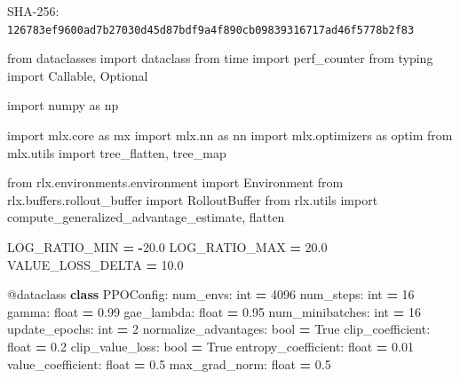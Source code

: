 \documentclass[
  american,
  11pt,
  letterpaper,
]{article}
\newenvironment{Shaded}{\begin{snugshade}}{\end{snugshade}}
\newcommand{\AttributeTok}[1]{\textcolor[rgb]{0.13,0.29,0.53}{#1}}
\newcommand{\BuiltInTok}[1]{#1}
\newcommand{\DecValTok}[1]{\textcolor[rgb]{0.00,0.00,0.81}{#1}}
\newcommand{\FloatTok}[1]{\textcolor[rgb]{0.00,0.00,0.81}{#1}}
\newcommand{\ImportTok}[1]{#1}
\newcommand{\KeywordTok}[1]{\textcolor[rgb]{0.13,0.29,0.53}{\textbf{#1}}}
\newcommand{\NormalTok}[1]{#1}
\newcommand{\OperatorTok}[1]{\textcolor[rgb]{0.81,0.36,0.00}{\textbf{#1}}}
\newcommand{\VariableTok}[1]{\textcolor[rgb]{0.00,0.00,0.00}{#1}}
\renewenvironment{Shaded}{\par\smallskip}{\par\smallskip}
\begin{document}
SHA-256:
\texttt{126783ef\allowbreak{}9600ad7b\allowbreak{}27030d45\allowbreak{}d87bdf9a\allowbreak{}4f890cb0\allowbreak{}98393167\allowbreak{}17ad46f5\allowbreak{}778b2f83\allowbreak{}}

\begin{Shaded}
\begin{Highlighting}[]
\ImportTok{from}\NormalTok{ dataclasses }\ImportTok{import}\NormalTok{ dataclass}
\ImportTok{from}\NormalTok{ time }\ImportTok{import}\NormalTok{ perf\_counter}
\ImportTok{from}\NormalTok{ typing }\ImportTok{import}\NormalTok{ Callable, Optional}

\ImportTok{import}\NormalTok{ numpy }\ImportTok{as}\NormalTok{ np}

\ImportTok{import}\NormalTok{ mlx.core }\ImportTok{as}\NormalTok{ mx}
\ImportTok{import}\NormalTok{ mlx.nn }\ImportTok{as}\NormalTok{ nn}
\ImportTok{import}\NormalTok{ mlx.optimizers }\ImportTok{as}\NormalTok{ optim}
\ImportTok{from}\NormalTok{ mlx.utils }\ImportTok{import}\NormalTok{ tree\_flatten, tree\_map}

\ImportTok{from}\NormalTok{ rlx.environments.environment }\ImportTok{import}\NormalTok{ Environment}
\ImportTok{from}\NormalTok{ rlx.buffers.rollout\_buffer }\ImportTok{import}\NormalTok{ RolloutBuffer}
\ImportTok{from}\NormalTok{ rlx.utils }\ImportTok{import}\NormalTok{ compute\_generalized\_advantage\_estimate, flatten}


\NormalTok{LOG\_RATIO\_MIN }\OperatorTok{=} \OperatorTok{{-}}\FloatTok{20.0}
\NormalTok{LOG\_RATIO\_MAX }\OperatorTok{=} \FloatTok{20.0}
\NormalTok{VALUE\_LOSS\_DELTA }\OperatorTok{=} \FloatTok{10.0}


\AttributeTok{@dataclass}
\KeywordTok{class}\NormalTok{ PPOConfig:}
\NormalTok{    num\_envs: }\BuiltInTok{int} \OperatorTok{=} \DecValTok{4096}
\NormalTok{    num\_steps: }\BuiltInTok{int} \OperatorTok{=} \DecValTok{16}
\NormalTok{    gamma: }\BuiltInTok{float} \OperatorTok{=} \FloatTok{0.99}
\NormalTok{    gae\_lambda: }\BuiltInTok{float} \OperatorTok{=} \FloatTok{0.95}
\NormalTok{    num\_minibatches: }\BuiltInTok{int} \OperatorTok{=} \DecValTok{16}
\NormalTok{    update\_epochs: }\BuiltInTok{int} \OperatorTok{=} \DecValTok{2}
\NormalTok{    normalize\_advantages: }\BuiltInTok{bool} \OperatorTok{=} \VariableTok{True}
\NormalTok{    clip\_coefficient: }\BuiltInTok{float} \OperatorTok{=} \FloatTok{0.2}
\NormalTok{    clip\_value\_loss: }\BuiltInTok{bool} \OperatorTok{=} \VariableTok{True}
\NormalTok{    entropy\_coefficient: }\BuiltInTok{float} \OperatorTok{=} \FloatTok{0.01}
\NormalTok{    value\_coefficient: }\BuiltInTok{float} \OperatorTok{=} \FloatTok{0.5}
\NormalTok{    max\_grad\_norm: }\BuiltInTok{float} \OperatorTok{=} \FloatTok{0.5}



\end{Highlighting}
\end{Shaded}
\end{document}

